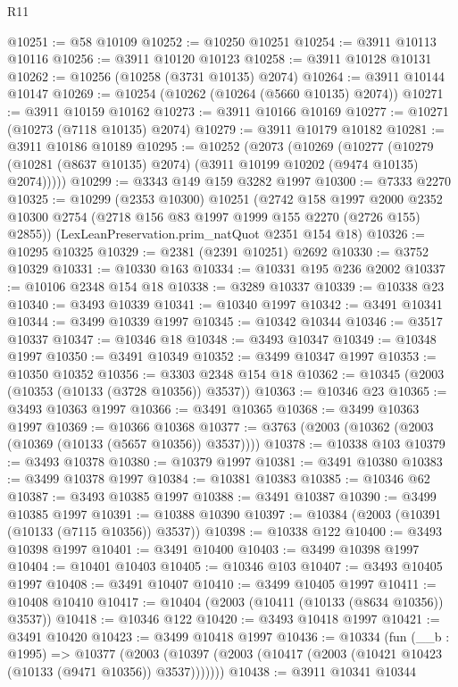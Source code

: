 \begin{lexlean}{R11}
\begin{coremodule}
@10251 := @58 @10109
@10252 := @10250 @10251
@10254 := @3911 @10113 @10116
@10256 := @3911 @10120 @10123
@10258 := @3911 @10128 @10131
@10262 := @10256 (@10258 (@3731 @10135) @2074)
@10264 := @3911 @10144 @10147
@10269 := @10254 (@10262 (@10264 (@5660 @10135) @2074))
@10271 := @3911 @10159 @10162
@10273 := @3911 @10166 @10169
@10277 := @10271 (@10273 (@7118 @10135) @2074)
@10279 := @3911 @10179 @10182
@10281 := @3911 @10186 @10189
@10295 := @10252
    (@2073
      (@10269
        (@10277 (@10279 (@10281 (@8637 @10135) @2074) (@3911 @10199 @10202 (@9474 @10135) @2074)))))
@10299 := @3343 @149 @159 @3282 @1997
@10300 := @7333 @2270
@10325 := @10299
    (@2353 @10300)
    @10251
    (@2742
      @158
      @1997
      @2000
      @2352
      @10300
      @2754
      (@2718 @156 @83 @1997 @1999 @155 @2270 (@2726 @155) @2855))
    (LexLeanPreservation.prim_natQuot @2351 @154 @18)
@10326 := @10295 @10325
@10329 := @2381 (@2391 @10251) @2692
@10330 := @3752 @10329
@10331 := @10330 @163
@10334 := @10331 @195 @236 @2002
@10337 := @10106 @2348 @154 @18
@10338 := @3289 @10337
@10339 := @10338 @23
@10340 := @3493 @10339
@10341 := @10340 @1997
@10342 := @3491 @10341
@10344 := @3499 @10339 @1997
@10345 := @10342 @10344
@10346 := @3517 @10337
@10347 := @10346 @18
@10348 := @3493 @10347
@10349 := @10348 @1997
@10350 := @3491 @10349
@10352 := @3499 @10347 @1997
@10353 := @10350 @10352
@10356 := @3303 @2348 @154 @18
@10362 := @10345 (@2003 (@10353 (@10133 (@3728 @10356)) @3537))
@10363 := @10346 @23
@10365 := @3493 @10363 @1997
@10366 := @3491 @10365
@10368 := @3499 @10363 @1997
@10369 := @10366 @10368
@10377 := @3763 (@2003 (@10362 (@2003 (@10369 (@10133 (@5657 @10356)) @3537))))
@10378 := @10338 @103
@10379 := @3493 @10378
@10380 := @10379 @1997
@10381 := @3491 @10380
@10383 := @3499 @10378 @1997
@10384 := @10381 @10383
@10385 := @10346 @62
@10387 := @3493 @10385 @1997
@10388 := @3491 @10387
@10390 := @3499 @10385 @1997
@10391 := @10388 @10390
@10397 := @10384 (@2003 (@10391 (@10133 (@7115 @10356)) @3537))
@10398 := @10338 @122
@10400 := @3493 @10398 @1997
@10401 := @3491 @10400
@10403 := @3499 @10398 @1997
@10404 := @10401 @10403
@10405 := @10346 @103
@10407 := @3493 @10405 @1997
@10408 := @3491 @10407
@10410 := @3499 @10405 @1997
@10411 := @10408 @10410
@10417 := @10404 (@2003 (@10411 (@10133 (@8634 @10356)) @3537))
@10418 := @10346 @122
@10420 := @3493 @10418 @1997
@10421 := @3491 @10420
@10423 := @3499 @10418 @1997
@10436 := @10334
    (fun (__b : @1995) =>
    @10377 (@2003 (@10397 (@2003 (@10417 (@2003 (@10421 @10423 (@10133 (@9471 @10356)) @3537)))))))
@10438 := @3911 @10341 @10344

\end{coremodule}
\end{lexlean}
